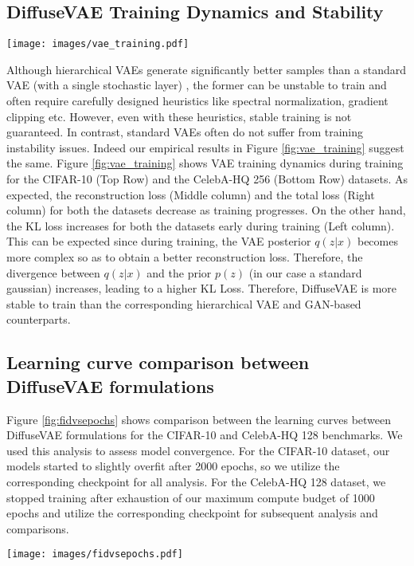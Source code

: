\documentclass[10pt]{article} \usepackage[accepted]{tmlr}
\begin{document}
\subsection{DiffuseVAE Training Dynamics and Stability}

\begin{figure*}
  \centering
    \texttt{[image: images/vae\_training.pdf]}
    \caption{Illustration of VAE training dynamics on the CIFAR-10 (Top Row) and the CelebA-HQ 256 dataset (Bottom Row) datasets. The columns from left to right represent the variation in KL loss, Reconstruction Loss and Total Loss during training respectively.}
    \label{fig:vae_training}
\end{figure*}
Although hierarchical VAEs \citep{vahdat2021nvae, child2021deep} generate significantly better samples than a standard VAE (with a single stochastic layer) \citep{kingma2014autoencoding}, the former can be unstable to train and often require carefully designed heuristics like spectral normalization, gradient clipping etc. However, even with these heuristics, stable training is not guaranteed. In contrast, standard VAEs often do not suffer from training instability issues. Indeed our empirical results in Figure \ref{fig:vae_training} suggest the same. Figure \ref{fig:vae_training} shows VAE training dynamics during training for the CIFAR-10 (Top Row) and the CelebA-HQ 256 (Bottom Row) datasets. As expected, the reconstruction loss (Middle column) and the total loss (Right column) for both the datasets decrease as training progresses. On the other hand, the KL loss increases for both the datasets early during training (Left column). This can be expected since during training, the VAE posterior $q(z|x)$ becomes more complex so as to obtain a better reconstruction loss. Therefore, the divergence between $q(z|x)$ and the prior $p(z)$ (in our case a standard gaussian) increases, leading to a higher KL Loss. Therefore, DiffuseVAE is more stable to train than the corresponding hierarchical VAE and GAN-based counterparts.

\subsection{Learning curve comparison between DiffuseVAE formulations}
Figure \ref{fig:fidvsepochs} shows comparison between the learning curves between DiffuseVAE formulations for the CIFAR-10 and CelebA-HQ 128 benchmarks. We used this analysis to assess model convergence. For the CIFAR-10 dataset, our models started to slightly overfit after 2000 epochs, so we utilize the corresponding checkpoint for all analysis. For the CelebA-HQ 128 dataset, we stopped training after exhaustion of our maximum compute budget of 1000 epochs and utilize the corresponding checkpoint for subsequent analysis and comparisons.
\begin{figure*}[h]
  \centering
    \texttt{[image: images/fidvsepochs.pdf]}
    \caption{Learning curve (FID vs epochs) comparison between DiffuseVAE formulations for the CIFAR-10 (Left) and the CelebA-HQ-128 dataset (Right). T=1000 during inference}
    \label{fig:fidvsepochs}
\end{figure*}
\end{document}

